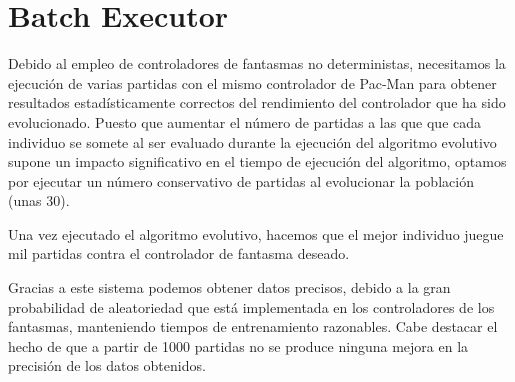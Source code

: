 \section{Batch Executor}
Debido al empleo de controladores de fantasmas no deterministas, necesitamos la ejecución de varias partidas con el mismo controlador de Pac-Man para obtener resultados estadísticamente correctos del rendimiento del controlador que ha sido evolucionado. Puesto que aumentar el número de partidas a las que que cada individuo se somete al ser evaluado durante la ejecución del algoritmo evolutivo supone un impacto significativo en el tiempo de ejecución del algoritmo, optamos por ejecutar un número conservativo de partidas al evolucionar la población (unas 30).
 
Una vez ejecutado el algoritmo evolutivo, hacemos que el  mejor individuo juegue mil partidas contra el controlador de fantasma deseado.
 
Gracias a este sistema podemos obtener datos precisos, debido a la gran probabilidad de aleatoriedad que está implementada en los controladores de los fantasmas, manteniendo tiempos de entrenamiento razonables. Cabe destacar el hecho de que a partir de 1000 partidas no se produce ninguna mejora en la precisión de los datos obtenidos.
